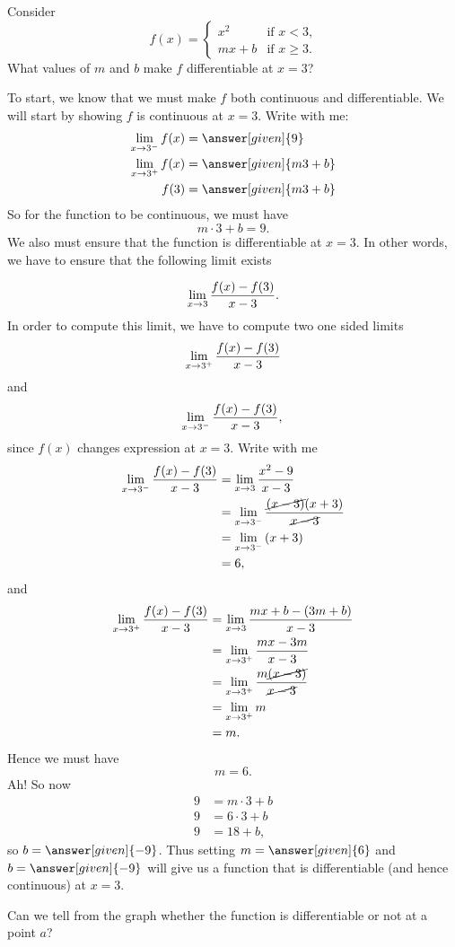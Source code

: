 \documentclass{ximera}
\begin{document}
\begin{example}
  Consider
  \[
  f(x) = \begin{cases}
          x^2 &\text{if $x<3$,}\\
          mx+b &\text{if $x\ge 3$.}
         \end{cases}
  \]
  What values of $m$ and $b$ make $f$ differentiable at $x=3$?
  \begin{explanation}
    To start, we know that we must make $f$ both continuous and
    differentiable. We will start by showing $f$ is continuous at
    $x=3$. Write with me:
    \begin{align*}
      \lim_{x\to 3^-} f(x) &= \answer[given]{9}\\
      \lim_{x\to 3^+} f(x) &= \answer[given]{m 3 + b}\\
      f(3) &= \answer[given]{m 3 + b}
    \end{align*}
    So for the function to be continuous, we must have
    \[
    m\cdot 3 + b =9.
    \]
    We also must ensure that the function is differentiable at $x=3$. In other words, we have to ensure that the following limit exists

 \[
 \lim_{x\to 3}\frac{f(x)-f(3)}{x-3}.\\
\]
In order to compute this limit, we have to compute  two one sided limits
 \[
 \lim_{x\to 3^{+}}\frac{f(x)-f(3)}{x-3}\\
\]
and
\[
 \lim_{x\to 3^{-}}\frac{f(x)-f(3)}{x-3},\\
\]
since  $f(x)$ changes expression at $x=3$.
Write with me
     \begin{align*}
        \lim_{x\to 3^{-}}\frac{f(x)-f(3)}{x-3}&= \lim_{x\to 3}\frac{x^2 -9}{x-3}\\
      &= \lim_{x\to 3^{-}}\frac{\cancel{(x-3)}(x+3)}{\cancel{x-3}}\\
      &= \lim_{x\to 3^{-}}\left(x+3\right)\\
      &=6,
    \end{align*}
    and
   \begin{align*}
        \lim_{x\to 3^{+}}\frac{f(x)-f(3)}{x-3}&= \lim_{x\to 3}\frac{mx+b -(3m+b)}{x-3}\\
          &= \lim_{x\to 3^{+}}\frac{mx-3m}{x-3}\\
      &= \lim_{x\to 3^{+}}\frac{m\cancel{(x-3)}}{\cancel{x-3}}\\
      &= \lim_{x\to 3^{+}}m\\
      &=m.
    \end{align*}
    Hence we must have
   \[
      m=6.
  \]
    Ah! So now
    \begin{align*}
      9 &= m\cdot 3 + b\\
      9 &= 6\cdot 3 + b\\
      9 &= 18 + b,
    \end{align*}
    so $b=\answer[given]{-9}$. Thus setting $m=\answer[given]{6}$ and
    $b=\answer[given]{-9}$ will give us a function that is differentiable (and hence
    continuous) at $x=3$.
   
  \end{explanation}
\end{example}
Can we tell from the graph whether the function is differentiable or not at a point $a$?
\end{document}
